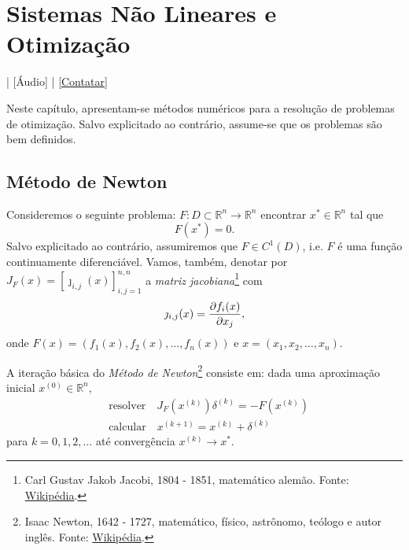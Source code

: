
\chapter{Sistemas Não Lineares e Otimização}\label{cap_otimizacao}
\thispagestyle{fancy}

\begin{flushright}
  [Vídeo] | [Áudio] | \href{https://phkonzen.github.io/notas/contato.html}{[Contatar]}
\end{flushright}

Neste capítulo, apresentam-se métodos numéricos para a resolução de problemas de otimização. Salvo explicitado ao contrário, assume-se que os problemas são bem definidos.

\section{Método de Newton}\label{cap_otimizacao_sec_newton}

Consideremos o seguinte problema: $F:D\subset \mathbb{R}^n\to\mathbb{R}^n$ encontrar $x^*\in\mathbb{R}^n$ tal que
\begin{equation}
  F(x^*) = 0.
\end{equation}
Salvo explicitado ao contrário, assumiremos que $F\in C^1(D)$, i.e. $F$ é uma função continuamente diferenciável. Vamos, também, denotar por $J_F(x) = [\jmath_{i,j}(x)]_{i,j=1}^{n,n}$ a \emph{matriz jacobiana}\footnote{Carl Gustav Jakob Jacobi, 1804 - 1851, matemático alemão. Fonte: \href{https://pt.wikipedia.org/wiki/Carl_Gustav_Jakob_Jacobi}{Wikipédia}.} com
\begin{equation}
  \jmath_{i,j}(x) = \frac{\partial f_i(x)}{\partial x_j},
\end{equation}
onde $F(x) = (f_1(x), f_2(x), \dotsc, f_n(x))$ e $x = (x_1, x_2,\dotsc, x_n)$.

A iteração básica do \emph{Método de Newton}\footnote{Isaac Newton, 1642 - 1727, matemático, físico, astrônomo, teólogo e autor inglês. Fonte: \href{https://pt.wikipedia.org/wiki/Isaac_Newton}{Wikipédia}.} consiste em: dada uma aproximação inicial $x^{(0)}\in\mathbb{R}^n$,
\begin{align}
  &\text{resolver}\quad J_F\left(x^{(k)}\right)\delta^{(k)} = -F\left(x^{(k)}\right)\\
  &\text{calcular}\quad x^{(k+1)} = x^{(k)} + \delta^{(k)}
\end{align}
para $k=0,1,2,\ldots$ até convergência $x^{(k)}\to x^*$.


